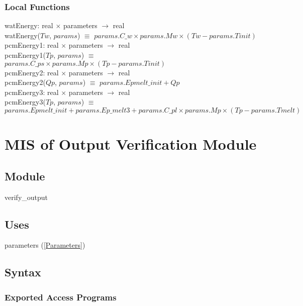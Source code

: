 \documentclass[12pt]{article}
\begin{document}
\subsubsection{Local Functions}

watEnergy: real $\times$ parameters $\rightarrow$ real \\
watEnergy($Tw$, $params$) $\equiv$ $params.C\_w \times params.Mw \times (Tw - params.Tinit)$ \\
\newline
pcmEnergy1: real $\times$ parameters $\rightarrow$ real \\
pcmEnergy1($Tp$, $params$) $\equiv$ $params.C\_ps \times params.Mp \times (Tp - params.Tinit)$ \\
\newline
pcmEnergy2: real $\times$ parameters $\rightarrow$ real \\
pcmEnergy2($Qp$, $params$) $\equiv$ $params.Epmelt\_init + Qp$ \\
\newline
pcmEnergy3: real $\times$ parameters $\rightarrow$ real \\
pcmEnergy3($Tp$, $params$) $\equiv$ $params.Epmelt\_init + params.Ep\_melt3 + params.C\_pl \times params.Mp \times (Tp - params.Tmelt)$ \\

\section{MIS of Output Verification Module} \label{VerifyOutput}

\subsection{Module}

verify\_output

\subsection{Uses}

parameters (\ref{Parameters})

\subsection{Syntax}

\subsubsection{Exported Access Programs}
\end{document}
